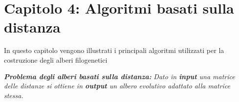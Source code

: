 \chapter{Capitolo 4: Algoritmi basati sulla distanza}
In questo capitolo vengono illustrati i principali algoritmi utilizzati per la costruzione degli alberi filogenetici
\begin{center}
\textit{\textbf{Problema degli alberi basati sulla distanza:}}
\newline
\textit{Dato in \textbf{input} una matrice delle distanze si ottiene in \textbf{output} un albero evolutivo adattato alla matrice stessa.}
\end{center}